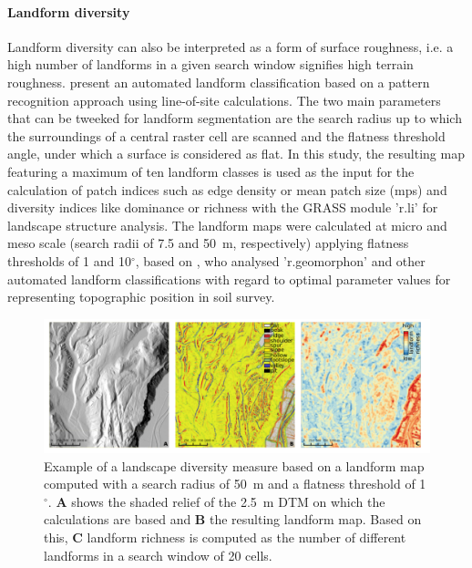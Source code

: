 \documentclass[preprint,12pt,authoryear]{elsarticle}
\begin{document}
\paragraph{Landform diversity} 
Landform diversity can also be interpreted as a form of surface roughness, i.e. a high number of landforms in a given search window signifies high terrain roughness. \citep{Jasiewicz2013} present an automated landform classification based on a pattern recognition approach using  line-of-site calculations. The two main parameters that can be tweeked for landform segmentation are the search radius up to which the surroundings of a central raster cell are scanned and the flatness threshold angle, under which a surface is considered as flat.  In this study, the resulting map featuring a maximum of ten landform classes is used as the input for the calculation of patch indices such as edge density or mean patch size (mps) and diversity indices like dominance or richness with the GRASS module 'r.li' for landscape structure analysis. The landform maps were calculated at micro and meso scale (search radii of 7.5 and 50~m, respectively) applying flatness thresholds of 1 and 10$^{\circ}$, based on \cite{Gruber2017}, who analysed 'r.geomorphon' and other automated landform classifications with regard to optimal parameter values for representing topographic position in soil survey.
 \begin{figure}[ht!]
\includegraphics[width=\textwidth,angle=0]{diversity_100pi.pdf}
\caption{Example of a landscape diversity measure based on a landform map computed with a search radius of 50~m and a flatness threshold of 1$^{\circ}$. \textbf{A} shows the shaded relief of the 2.5~m DTM on which the calculations are based and \textbf{B} the resulting landform map. Based on this, \textbf{C} landform richness  is computed as the number of different landforms in a search window of 20 cells.}
\label{fig:richness}
\end{figure}
\end{document}
